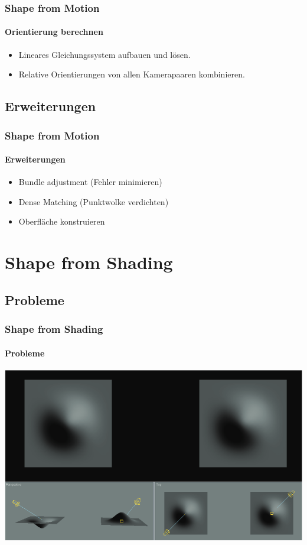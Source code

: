 \documentclass{beamer}
\begin{document}
\begin{frame}
	\frametitle{Shape from Motion}
	\framesubtitle{Orientierung berechnen}
	
	\begin{itemize}
		\item Lineares Gleichungssystem aufbauen und lösen.
		\item Relative Orientierungen von allen Kamerapaaren kombinieren.
	\end{itemize}
\end{frame}


\subsection{Erweiterungen}
\begin{frame}
	\frametitle{Shape from Motion}
	\framesubtitle{Erweiterungen}
	
	\begin{itemize}
		\item Bundle adjustment (Fehler minimieren)
		\item Dense Matching (Punktwolke verdichten)
		\item Oberfläche konstruieren
	\end{itemize}
\end{frame}


\section{Shape from Shading}
\subsection{Probleme}
\begin{frame}
	\frametitle{Shape from Shading}
	\framesubtitle{Probleme}
	
	\includegraphics[width=\linewidth]{includes/shading_problem}
\end{frame}
\end{document}
